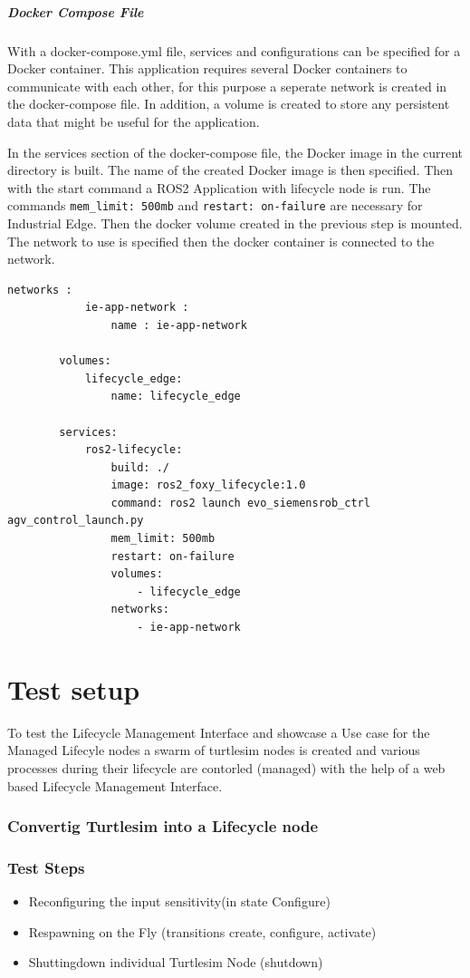 \paragraph{Docker Compose File}
With a docker-compose.yml file, services and configurations can be specified for a Docker container. This application requires several Docker containers to communicate with each other, for this purpose a seperate network is created in the docker-compose file. In addition, a volume is created to store any persistent data that might be useful for the application.

In the services section of the docker-compose file, the Docker image in the current directory is built. The name of the created Docker image is then specified. Then with the start command a \gls{ROS2} Application with lifecycle node is run. The commands \lstinline{mem_limit: 500mb} and \lstinline{restart: on-failure} are necessary for Industrial Edge. Then the docker volume created in the previous step is mounted. The network to use is specified then the docker container is connected to the network.
\begin{lstlisting}[language=docker-compose,
		caption={docker-compose.yaml used by IE Publisher},
		label={Implementation:dockerCompose}]
		networks :
 			ie-app-network :
	 			name : ie-app-network

		volumes:
			lifecycle_edge:
				name: lifecycle_edge
		
		services:
			ros2-lifecycle:
				build: ./
				image: ros2_foxy_lifecycle:1.0
				command: ros2 launch evo_siemensrob_ctrl agv_control_launch.py 
				mem_limit: 500mb
				restart: on-failure
				volumes:
					- lifecycle_edge
				networks:
					- ie-app-network		
\end{lstlisting}

		
	
\chapter{Test setup}	

To test the Lifecycle Management Interface and showcase a Use case for the Managed Lifecyle nodes a swarm of turtlesim nodes is created and various processes during their lifecycle are contorled (managed) with the help of a web based Lifecycle Management Interface. 
\subsection{Convertig Turtlesim into a Lifecycle node}

\subsection{Test Steps}
\begin{itemize}
	\item Reconfiguring the input sensitivity(in state Configure)
	\item Respawning on the Fly (transitions create, configure, activate)
	\item Shuttingdown individual Turtlesim Node (shutdown)
\end{itemize}